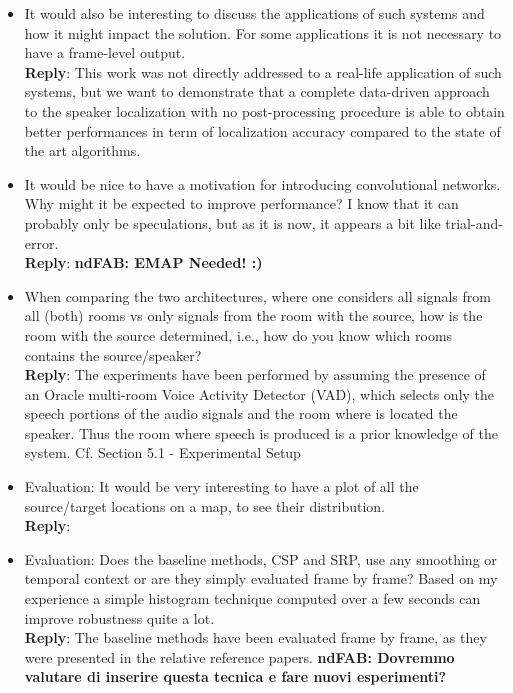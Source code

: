 \documentclass[11pt, technote, letterpaper, oneside, onecolumn]{IEEEtran}
\begin{document}
\begin{itemize}
\item It would also be interesting to discuss the applications of such systems and how it might impact the solution. For some applications it is not necessary to have a frame-level output.\\
\textbf{Reply}: This work was not directly addressed to a real-life application of such systems, but we want to demonstrate that a complete data-driven approach to the speaker localization with no post-processing procedure is able to obtain better performances in term of localization accuracy compared to the state of the art algorithms.

\item It would be nice to have a motivation for introducing convolutional networks. Why might it be expected to improve performance? I know that it can probably only be speculations, but as it is now, it appears a bit like trial-and-error.\\
\textbf{Reply}: \textbf{ndFAB: EMAP Needed! :)}

\item When comparing the two architectures, where one considers all signals from all (both) rooms vs only signals from the room with the source, how is the room with the source determined, i.e., how do you know which rooms contains the source/speaker?\\
\textbf{Reply}: The experiments have been performed by assuming the presence of an Oracle multi-room Voice Activity Detector (VAD), which selects only the speech portions of the audio signals and the room where is located the speaker. Thus the room where speech is produced is a prior knowledge of the system. Cf. Section 5.1 - Experimental Setup

\item Evaluation: It would be very interesting to have a plot of all the source/target locations on a map, to see their distribution.\\
\textbf{Reply}:

\item Evaluation: Does the baseline methods, CSP and SRP, use any smoothing or temporal context or are they simply evaluated frame by frame? Based on my experience a simple histogram technique computed over a few seconds can improve robustness quite a lot.\\
\textbf{Reply}: The baseline methods have been evaluated frame by frame, as they were presented in the relative reference papers. \textbf{ndFAB: Dovremmo valutare di inserire questa tecnica e fare nuovi esperimenti?}


\end{itemize}
\end{document}
